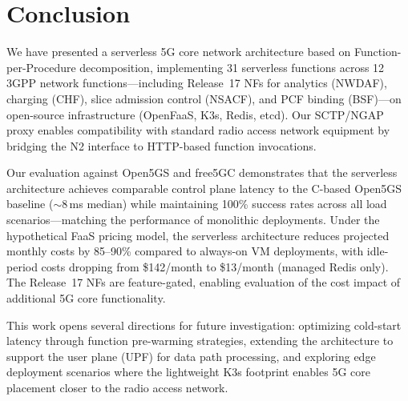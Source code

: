 \section{Conclusion}
\label{sec:conclusion}

We have presented a serverless 5G core network architecture based on Function-per-Procedure decomposition, implementing 31 serverless functions across 12 3GPP network functions---including Release~17 NFs for analytics (NWDAF), charging (CHF), slice admission control (NSACF), and PCF binding (BSF)---on open-source infrastructure (OpenFaaS, K3s, Redis, etcd). Our SCTP/NGAP proxy enables compatibility with standard radio access network equipment by bridging the N2 interface to HTTP-based function invocations.

Our evaluation against Open5GS and free5GC demonstrates that the serverless architecture achieves comparable control plane latency to the C-based Open5GS baseline ($\sim$8\,ms median) while maintaining 100\% success rates across all load scenarios---matching the performance of monolithic deployments. Under the hypothetical FaaS pricing model, the serverless architecture reduces projected monthly costs by 85--90\% compared to always-on VM deployments, with idle-period costs dropping from \$142/month to \$13/month (managed Redis only). The Release~17 NFs are feature-gated, enabling evaluation of the cost impact of additional 5G core functionality.

This work opens several directions for future investigation: optimizing cold-start latency through function pre-warming strategies, extending the architecture to support the user plane (UPF) for data path processing, and exploring edge deployment scenarios where the lightweight K3s footprint enables 5G core placement closer to the radio access network.

